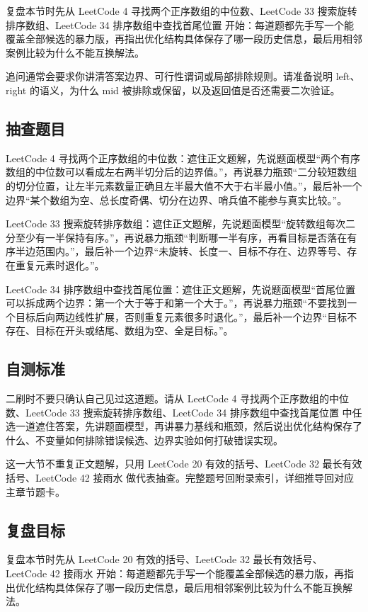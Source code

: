 复盘本节时先从 LeetCode 4 寻找两个正序数组的中位数、LeetCode 33 搜索旋转排序数组、LeetCode 34 排序数组中查找首尾位置 开始：每道题都先手写一个能覆盖全部候选的暴力版，再指出优化结构具体保存了哪一段历史信息，最后用相邻案例比较为什么不能互换解法。

追问通常会要求你讲清答案边界、可行性谓词或局部排除规则。请准备说明 left、right 的语义，为什么 mid 被排除或保留，以及返回值是否还需要二次验证。

\subsection{抽查题目}

LeetCode 4 寻找两个正序数组的中位数：遮住正文题解，先说题面模型“两个有序数组的中位数可以看成左右两半切分后的边界值。”，再说暴力瓶颈“二分较短数组的切分位置，让左半元素数量正确且左半最大值不大于右半最小值。”，最后补一个边界“某个数组为空、总长度奇偶、切分在边界、哨兵值不能参与真实比较。”。

LeetCode 33 搜索旋转排序数组：遮住正文题解，先说题面模型“旋转数组每次二分至少有一半保持有序。”，再说暴力瓶颈“判断哪一半有序，再看目标是否落在有序半边范围内。”，最后补一个边界“未旋转、长度一、目标不存在、边界等号、存在重复元素时退化。”。

LeetCode 34 排序数组中查找首尾位置：遮住正文题解，先说题面模型“首尾位置可以拆成两个边界：第一个大于等于和第一个大于。”，再说暴力瓶颈“不要找到一个目标后向两边线性扩展，否则重复元素很多时退化。”，最后补一个边界“目标不存在、目标在开头或结尾、数组为空、全是目标。”。

\subsection{自测标准}

二刷时不要只确认自己见过这道题。请从 LeetCode 4 寻找两个正序数组的中位数、LeetCode 33 搜索旋转排序数组、LeetCode 34 排序数组中查找首尾位置 中任选一道遮住答案，先讲题面模型，再讲暴力基线和瓶颈，然后说出优化结构保存了什么、不变量如何排除错误候选、边界实验如何打破错误实现。

这一大节不重复正文题解，只用 LeetCode 20 有效的括号、LeetCode 32 最长有效括号、LeetCode 42 接雨水 做代表抽查。完整题号回附录索引，详细推导回对应主章节题卡。

\subsection{复盘目标}

复盘本节时先从 LeetCode 20 有效的括号、LeetCode 32 最长有效括号、LeetCode 42 接雨水 开始：每道题都先手写一个能覆盖全部候选的暴力版，再指出优化结构具体保存了哪一段历史信息，最后用相邻案例比较为什么不能互换解法。

